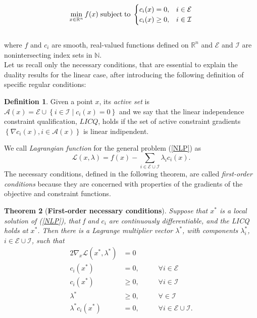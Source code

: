 \documentclass[a4paper,10 pt,titlepage,twoside]{report}
\theoremstyle{plain}
\newtheorem{thm}{Theorem}[chapter]
\theoremstyle{definition}
\newtheorem{defn}[thm]{Definition}
\theoremstyle{remark}
\begin{document}
\begin{equation}\label{NLP}
\min\limits_{x\in\mathbb{R}^{n}} f(x)\text{\;subject\;to\;}\begin{cases} c_{i}(x) = 0, &i \in \mathcal{E}\\ c_{i}(x)\geq 0, &i\in \mathcal{I}\end{cases}
\end{equation}
\\
where $f$ and $c_{i}$ are smooth, real-valued functions defined on $\mathbb{R}^{n}$ and $\mathcal{E}$ and $\mathcal{I}$ are nonintersecting index sets in $\mathbb{N}$.\\Let us recall only the necessary conditions, that are essential to explain the duality results for the linear case, after introducing the following definition of specific regular conditions:
\begin{defn}
	Given a point $x$, its \textit{active set} is $\mathcal{A}(x)= \mathcal{E}\cup\left\lbrace i\in\mathcal{I}\;|\;c_{i}(x) =0\right\rbrace$ and we say that the linear independence constraint qualification, $LICQ$, holds if the set of active constraint gradients $\left\lbrace \nabla c_{i}(x),i\in\mathcal{A}(x)\right\rbrace$ is linear indipendent.
\end{defn}
We call \textit{Lagrangian function} for the general problem (\ref{NLP}) as 
\begin{equation*}
\mathcal{L}\left(x,\lambda\right)=f(x)-\sum_{i\in\mathcal{E}\cup\mathcal{I}}\lambda_{i}c_{i}(x).
\end{equation*}
The necessary conditions, defined in the following theorem, are called \textit{first-order conditions} because they are concerned with properties of the gradients of the objective and constraint functions.

\begin{thm}[\textbf{First-order necessary conditions}]\label{thm:kkt}
Suppose that $x^{*}$ is a local solution of (\ref{NLP}), that f and $c_{i}$ are continuously differentiable, and the LICQ holds at $x^{*}$. Then there is a Lagrange multiplier vector $\lambda^{*}$, with components $\lambda^{*}_{i}$, $i \in \mathcal{E}\cup\mathcal{I}$, such that 
\begin{alignat*}{2}
\nabla_{x}\mathcal{L}(x^{*},\lambda^{*})&=0&&\\
c_{i}(x^{*})&=0, &&\;\;\;\;\forall i\in\mathcal{E}\\
c_{i}(x^{*})&\geq 0, &&\;\;\;\;\forall i\in\mathcal{I}\\
\lambda^{*} &\geq 0, &&\;\;\;\;\forall \in\mathcal{I}\\
\lambda^{*}c_{i}(x^{*})&= 0,&&\;\;\;\;\forall i\in\mathcal{E}\cup\mathcal{I}.\label{CompCon}\\
\end{alignat*} 
\end{thm}
\end{document}
